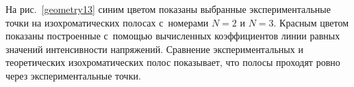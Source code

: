 %


На рис.~\ref{geometry13} синим цветом показаны выбранные экспериментальные точки на изохроматических полосах с~номерами $N=2$ и $N=3.$ 
Красным цветом показаны построенные с~помощью вычисленных коэффициентов  линии равных значений интенсивности напряжений. Сравнение экспериментальных и теоретических изохроматических полос показывает, что полосы проходят ровно через экспериментальные точки.




